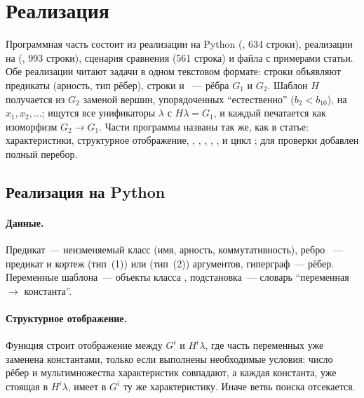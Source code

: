
\section{Реализация}
\label{sec:impl}

Программная часть состоит из реализации на Python (, 634 строки), реализации на \Cpp{} (, 993 строки), сценария сравнения  (561 строка) и файла  с примерами статьи.
Обе реализации читают задачи в одном текстовом формате: строки  объявляют предикаты (арность, тип рёбер), строки  и ~--- рёбра $G_1$ и $G_2$.
Шаблон $H$ получается из $G_2$ заменой вершин, упорядоченных \enquote{естественно} ($b_2 < b_{10}$), на $x_1, x_2, \dots$; ищутся все унификаторы $\lambda$ с $H\lambda = G_1$, и каждый печатается как изоморфизм $G_2 \to G_1$.
Части программы названы так же, как в статье: характеристики, структурное отображение, \ISOMm{}, \ISOMone{}, , , ,  и цикл \ISOMn{}; для проверки добавлен полный перебор.

\subsection{Реализация на Python}
\label{subsec:python}

\paragraph{Данные.}
Предикат~--- неизменяемый класс  (имя, арность, коммутативность), ребро ~--- предикат и кортеж (тип~(1)) или  (тип~(2)) аргументов, гиперграф~---  рёбер.
Переменные шаблона~--- объекты класса , подстановка~--- словарь \enquote{переменная $\to$ константа}.

\paragraph{Структурное отображение.}
Функция  строит отображение между $G^i$ и $H^i\lambda$, где часть переменных уже заменена константами, только если выполнены необходимые условия: число рёбер и мультимножества характеристик совпадают, а каждая константа, уже стоящая в $H^i\lambda$, имеет в $G^i$ ту же характеристику.
Иначе ветвь поиска отсекается.

